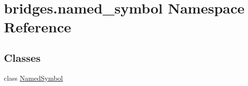 \hypertarget{namespacebridges_1_1named__symbol}{}\section{bridges.\+named\+\_\+symbol Namespace Reference}
\label{namespacebridges_1_1named__symbol}
\subsection*{Classes}
\begin{DoxyCompactItemize}
\item 
class \hyperlink{classbridges_1_1named__symbol_1_1_named_symbol}{Named\+Symbol}
\end{DoxyCompactItemize}
